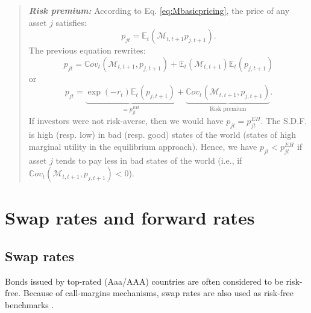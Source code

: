 \documentclass[
  12pt,
]{book}
\theoremstyle{definition}
\theoremstyle{definition}
\theoremstyle{definition}
\theoremstyle{definition}
\theoremstyle{remark}
\begin{document}
\begin{quote}
\textbf{\emph{Risk premium:}} According to Eq. \eqref{eq:Mbasicpricing}, the price of any asset \(j\) satisfies:
\[
p_{jt} = \mathbb{E}_t(\mathcal{M}_{t,t+1} p_{j,t+1}).
\]
The previous equation rewrites:
\[
p_{jt} =  \mathbb{C}ov_t(\mathcal{M}_{t,t+1}, p_{j,t+1}) + \mathbb{E}_t(\mathcal{M}_{t,t+1})\mathbb{E}_t( p_{j,t+1})
\]
or
\begin{equation}
p_{jt} = \underbrace{\exp(-r_t)\mathbb{E}_t( p_{j,t+1})}_{=p^{EH}_{jt}} + \underbrace{\mathbb{C}ov_t(\mathcal{M}_{t,t+1}, p_{j,t+1})}_{\mbox{Risk premium}}.\label{eq:CovRP}
\end{equation}
If investors were not risk-averse, then we would have \(p_{jt} = p^{EH}_{jt}\). The S.D.F. is high (resp. low) in bad (resp. good) states of the world (states of high marginal utility in the equilibrium approach). Hence, we have \(p_{jt}< p^{EH}_{jt}\) if asset \(j\) tends to pay less in bad states of the world (i.e., if \(\mathbb{C}ov_t(\mathcal{M}_{t,t+1}, p_{j,t+1})<0\)).
\end{quote}

\hypertarget{swap-rates-and-forward-rates}{%
\section{Swap rates and forward rates}\label{swap-rates-and-forward-rates}}

\hypertarget{swap-rates}{%
\subsection{Swap rates}\label{swap-rates}}

Bonds issued by top-rated (Aaa/AAA) countries are often considered to be risk-free. Because of call-margins mechanisms, swap rates are also used as risk-free benchmarks \citep{Duffie_Stein_2015}.
\end{document}

